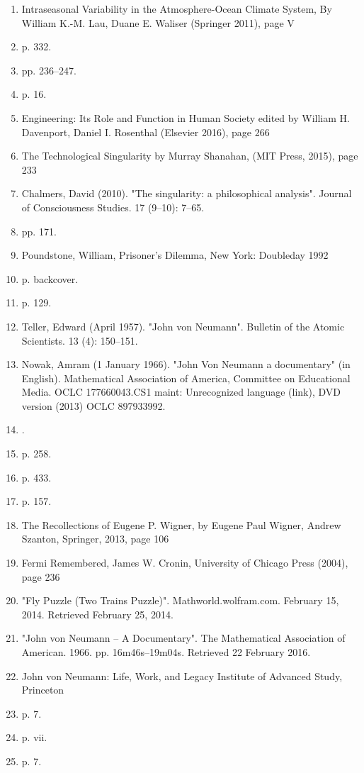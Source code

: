 \begin{enumerate}
\item Intraseasonal Variability in the Atmosphere-Ocean Climate System, By William K.-M. Lau, Duane E. Waliser (Springer 2011), page V
\item  p. 332.
\item  pp. 236–247.
\item  p. 16.
\item Engineering: Its Role and Function in Human Society edited by William H. Davenport, Daniel I. Rosenthal (Elsevier 2016), page 266
\item The Technological Singularity by Murray Shanahan, (MIT Press, 2015), page 233
\item Chalmers, David (2010). "The singularity: a philosophical analysis". Journal of Consciousness Studies. 17 (9–10): 7–65.
\item  pp. 171.
\item Poundstone, William, Prisoner's Dilemma, New York: Doubleday 1992
\item  p. backcover.
\item  p. 129.
\item Teller, Edward (April 1957). "John von Neumann". Bulletin of the Atomic Scientists. 13 (4): 150–151.
\item Nowak, Amram (1 January 1966). "John Von Neumann a documentary" (in English). Mathematical Association of America, Committee on Educational Media. OCLC 177660043.CS1 maint: Unrecognized language (link), DVD version (2013) OCLC 897933992.
\item .
\item  p. 258.
\item  p. 433.
\item  p. 157.
\item The Recollections of Eugene P. Wigner, by Eugene Paul Wigner, Andrew Szanton, Springer, 2013, page 106
\item Fermi Remembered, James W. Cronin, University of Chicago Press (2004), page 236
\item "Fly Puzzle (Two Trains Puzzle)". Mathworld.wolfram.com. February 15, 2014. Retrieved February 25, 2014.
\item "John von Neumann – A Documentary". The Mathematical Association of American. 1966. pp. 16m46s–19m04s. Retrieved 22 February 2016.
\item John von Neumann: Life, Work, and Legacy Institute of Advanced Study, Princeton
\item  p. 7.
\item  p. vii.
\item  p. 7.

\end{enumerate}
